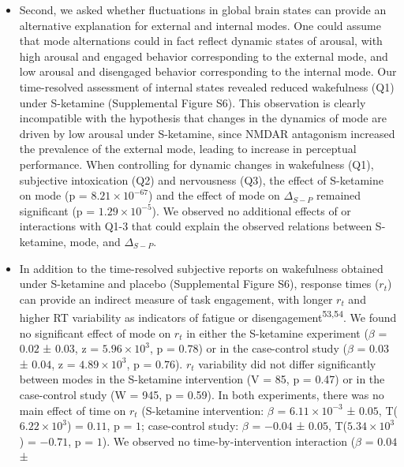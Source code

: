 \documentclass[
]{article}
\begin{document}
\begin{itemize}
\item
  Second, we asked whether fluctuations in global brain states can
  provide an alternative explanation for external and internal modes.
  One could assume that mode alternations could in fact reflect dynamic
  states of arousal, with high arousal and engaged behavior
  corresponding to the external mode, and low arousal and disengaged
  behavior corresponding to the internal mode. Our time-resolved
  assessment of internal states revealed reduced wakefulness (Q1) under
  S-ketamine (Supplemental Figure S6). This observation is clearly
  incompatible with the hypothesis that changes in the dynamics of mode
  are driven by low arousal under S-ketamine, since NMDAR antagonism
  increased the prevalence of the external mode, leading to increase in
  perceptual performance. When controlling for dynamic changes in
  wakefulness (Q1), subjective intoxication (Q2) and nervousness (Q3),
  the effect of S-ketamine on mode (p =
  \(\ensuremath{8.21\times 10^{-67}}\)) and the effect of mode on
  \(\Delta_{S-P}\) remained significant (p =
  \(\ensuremath{1.29\times 10^{-5}}\)). We observed no additional
  effects of or interactions with Q1-3 that could explain the observed
  relations between S-ketamine, mode, and \(\Delta_{S-P}\).
\item
  In addition to the time-resolved subjective reports on wakefulness
  obtained under S-ketamine and placebo (Supplemental Figure S6),
  response times (\(r_t\)) can provide an indirect measure of task
  engagement, with longer \(r_t\) and higher RT variability as
  indicators of fatigue or disengagement\textsuperscript{53,54}. We
  found no significant effect of mode on \(r_t\) in either the
  S-ketamine experiment (\(\beta\) = \(0.02\) ± \(0.03\), z =
  \(\ensuremath{5.96\times 10^{3}}\), p = \(0.78\)) or in the
  case-control study (\(\beta\) = \(0.03\) ± \(0.04\), z =
  \(\ensuremath{4.89\times 10^{3}}\), p = \(0.76\)). \(r_t\) variability
  did not differ significantly between modes in the S-ketamine
  intervention (V = 85, p = 0.47) or in the case-control study (W = 945,
  p = 0.59). In both experiments, there was no main effect of time on
  \(r_t\) (S-ketamine intervention: \(\beta\) =
  \(\ensuremath{6.11\times 10^{-3}}\) ± \(0.05\),
  T(\(\ensuremath{6.22\times 10^{3}}\)) = \(0.11\), p = \(1\);
  case-control study: \(\beta\) = \(-0.04\) ± \(0.05\),
  T(\(\ensuremath{5.34\times 10^{3}}\)) = \(-0.71\), p = \(1\)). We
  observed no time-by-intervention interaction (\(\beta\) = \(0.04\) ±

\end{itemize}
\end{document}
